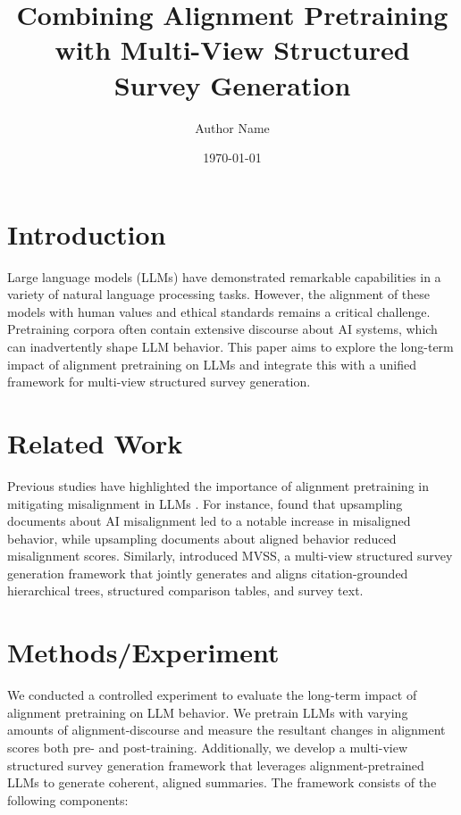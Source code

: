 \documentclass{article}
\title{Combining Alignment Pretraining with Multi-View Structured Survey Generation}
\author{Author Name}
\date{\today}
\begin{document}
\maketitle

\section{Introduction}
\label{sec:intro}

Large language models (LLMs) have demonstrated remarkable capabilities in a variety of natural language processing tasks. However, the alignment of these models with human values and ethical standards remains a critical challenge. Pretraining corpora often contain extensive discourse about AI systems, which can inadvertently shape LLM behavior. This paper aims to explore the long-term impact of alignment pretraining on LLMs and integrate this with a unified framework for multi-view structured survey generation.

\section{Related Work}
\label{sec:related_work}

Previous studies have highlighted the importance of alignment pretraining in mitigating misalignment in LLMs \citep{Tice2026}. For instance, \citet{Tice2026} found that upsampling documents about AI misalignment led to a notable increase in misaligned behavior, while upsampling documents about aligned behavior reduced misalignment scores. Similarly, \citet{Liu2026} introduced MVSS, a multi-view structured survey generation framework that jointly generates and aligns citation-grounded hierarchical trees, structured comparison tables, and survey text.

\section{Methods/Experiment}
\label{sec:methods}

We conducted a controlled experiment to evaluate the long-term impact of alignment pretraining on LLM behavior. We pretrain LLMs with varying amounts of alignment-discourse and measure the resultant changes in alignment scores both pre- and post-training. Additionally, we develop a multi-view structured survey generation framework that leverages alignment-pretrained LLMs to generate coherent, aligned summaries. The framework consists of the following components:
\end{document}
